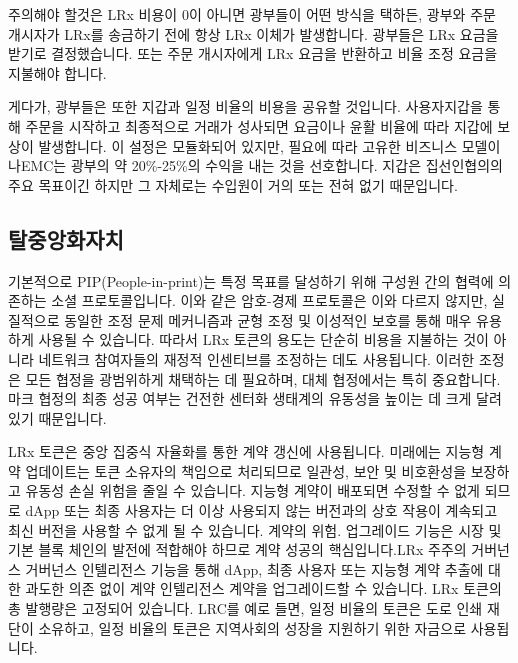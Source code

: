 \documentclass{article}
\begin{document}
\begin{multicols}{2}
\indent 주의해야 할것은 LRx 비용이 0이 아니면 광부들이 어떤 방식을 택하든, 광부와 주문 개시자가 LRx를 송금하기 전에 항상 LRx 이체가 발생합니다. 광부들은 LRx 요금을 받기로 결정했습니다. 또는 주문 개시자에게 LRx 요금을 반환하고 비율 조정 요금을 지불해야 합니다. 

\indent 게다가, 광부들은 또한 지갑과 일정 비율의 비용을 공유할 것입니다. 사용자지갑을 통해 주문을 시작하고 최종적으로 거래가 성사되면 요금이나 윤활 비율에 따라 지갑에 보상이 발생합니다. 이 설정은 모듈화되어 있지만, 필요에 따라 고유한 비즈니스 모델이나EMC는 광부의 약 20\%-25\%의 수익을 내는 것을 선호합니다. 지갑은 집선인협의의 주요 목표이긴 하지만 그 자체로는 수입원이 거의 또는 전혀 없기 때문입니다.

\subsection{탈중앙화자치}

\indent 기본적으로 PIP(People-in-print)는 특정 목표를 달성하기 위해 구성원 간의 협력에 의존하는 소셜 프로토콜입니다. 이와 같은 암호-경제 프로토콜은 이와 다르지 않지만, 실질적으로 동일한 조정 문제 메커니즘\cite{vitalikgovernance}과 균형 조정 및 이성적인 보호를 통해 매우 유용하게 사용될 수 있습니다. 따라서 LRx 토큰의 용도는 단순히 비용을 지불하는 것이 아니라 네트워크 참여자들의 재정적 인센티브를 조정하는 데도 사용됩니다. 이러한 조정은 모든 협정을 광범위하게 채택하는 데 필요하며, 대체 협정에서는 특히 중요합니다. 마크 협정의 최종 성공 여부는 건전한 센터화 생태계의 유동성을 높이는 데 크게 달려 있기 때문입니다.

\indent LRx 토큰은 중앙 집중식 자율화를 통한 계약 갱신에 사용됩니다. 미래에는 지능형 계약 업데이트는 토큰 소유자의 책임으로 처리되므로 일관성, 보안 및 비호환성을 보장하고 유동성 손실 위험을 줄일 수 있습니다. 지능형 계약이 배포되면 수정할 수 없게 되므로 dApp 또는 최종 사용자는 더 이상 사용되지 않는 버전과의 상호 작용이 계속되고 최신 버전을 사용할 수 없게 될 수 있습니다. 계약의 위험. 업그레이드 기능은 시장 및 기본 블록 체인의 발전에 적합해야 하므로 계약 성공의 핵심입니다.LRx 주주의 거버넌스 거버넌스 인텔리전스 기능을 통해 dApp, 최종 사용자 또는 지능형 계약 추출에 대한 과도한 의존 없이 계약 인텔리전스 계약을 업그레이드할 수 있습니다. LRx 토큰의 총 발행량은 고정되어 있습니다. LRC를 예로 들면, 일정 비율의 토큰은 도로 인쇄 재단이 소유하고, 일정 비율의 토큰은 지역사회의 성장을 지원하기 위한 자금으로 사용됩니다.


\end{multicols}
\end{document}
